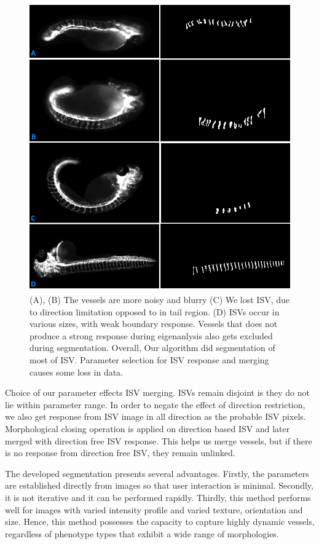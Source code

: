 \begin{figure}[H] 
 \centering
\includegraphics[scale=0.45]{figure/segISVLim.png}
  \caption[Images with the blurred and noisy ISV]{(A), (B) The vessels are more noisy and blurry (C) We lost ISV, due to direction limitation opposed to in tail region. (D) ISVs occur in various sizes, with weak boundary response. Vessels that does not produce a strong response during eigenanlysis also gets excluded during segmentation. Overall, Our algorithm did segmentation of most of ISV. Parameter selection for ISV response and merging causes some loss in data.}
 \label{segISVLim}
\end{figure}



Choice of our parameter effects ISV merging. ISVs remain disjoint is they do not lie within parameter range. In order to negate the effect of direction restriction, we also get response from ISV image in all direction as the probable ISV pixels. Morphological closing operation is applied on direction based ISV and later merged with direction free ISV response. This helps us merge vessels, but if there is no response from direction free ISV, they remain unlinked.

The developed segmentation presents several advantages. Firstly, the parameters are established directly from images so that user interaction is minimal. Secondly, it is not iterative and it can be performed rapidly. Thirdly, this method performs well for images with varied intensity profile and varied texture, orientation and size. Hence, this method possesses the capacity to capture highly dynamic vessels, regardless of phenotype types that exhibit a wide range of morphologies.

